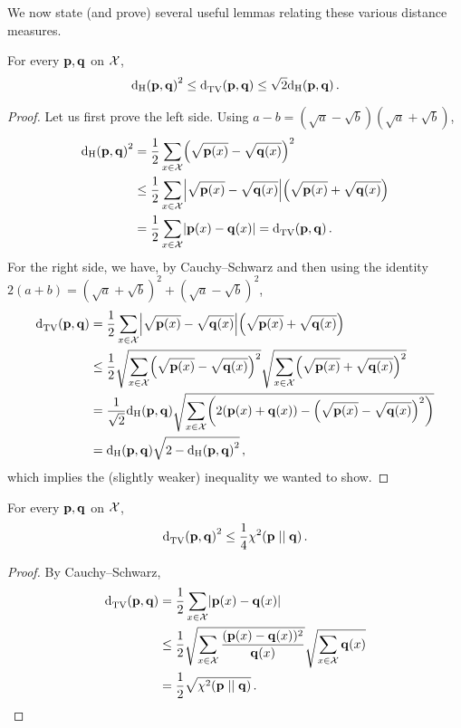 We now state (and prove) several useful lemmas relating these various distance measures.
\begin{lemma}
  \label{app:distances:hellinger}
For every $\mathbf{p},\mathbf{q}$ on $\mathcal{X}$, 
  \[
    \hellinger{\p}{\q}^2 \leq \totalvardist{\p}{\q} \leq \sqrt{2}\hellinger{\p}{\q}\,.
  \]
\end{lemma}
\begin{proof}
  Let us first prove the left side. Using $a-b=(\sqrt{a}-\sqrt{b})(\sqrt{a}+\sqrt{b})$,
  \begin{align*}
      \hellinger{\p}{\q}^2
      &= \frac{1}{2}\sum_{x\in\domain} \Paren{\sqrt{\p(x)}-\sqrt{\q(x)}}^2 \\
      &\leq \frac{1}{2}\sum_{x\in\domain} \abs{\sqrt{\p(x)}-\sqrt{\q(x)}}\Paren{\sqrt{\p(x)}+\sqrt{\q(x)}} \\
      &= \frac{1}{2}\sum_{x\in\domain} \abs{\p(x)-\q(x)} = \totalvardist{\p}{\q}\,.
  \end{align*}
 For the right side, we have, by Cauchy--Schwarz and then using the identity $2(a+b) = (\sqrt{a}+\sqrt{b})^2+(\sqrt{a}-\sqrt{b})^2$,
   \begin{align*}
      \totalvardist{\p}{\q} &= \frac{1}{2}\sum_{x\in\domain} \abs{\sqrt{\p(x)}-\sqrt{\q(x)}}\Paren{\sqrt{\p(x)}+\sqrt{\q(x)}}  \\
      &\leq \frac{1}{2}\sqrt{\sum_{x\in\domain} \Paren{\sqrt{\p(x)}-\sqrt{\q(x)}}^2}\sqrt{\sum_{x\in\domain} \Paren{\sqrt{\p(x)}+\sqrt{\q(x)}}^2} \\
      &= \frac{1}{\sqrt{2}}\hellinger{\p}{\q}\sqrt{\sum_{x\in\domain} \Paren{2(\p(x)+\q(x))-\Paren{\sqrt{\p(x)}-\sqrt{\q(x)}}^2 }}\\
      &= \hellinger{\p}{\q}\sqrt{2-\hellinger{\p}{\q}^2 }\,,
  \end{align*}
  which implies the (slightly weaker) inequality we wanted to show.
\end{proof}

\begin{lemma}
  \label{app:distances:chi2:tv}
For every $\mathbf{p},\mathbf{q}$ on $\mathcal{X}$, 
  \[
    \totalvardist{\p}{\q}^2 \leq \frac{1}{4}\chisquare{\p}{\q}\,.
  \]
\end{lemma}
\begin{proof}
  By Cauchy--Schwarz, 
  \begin{align*}
      \totalvardist{\p}{\q} &= \frac{1}{2}\sum_{x\in\domain} \abs{\p(x)-\q(x)} \\
      &\leq \frac{1}{2}\sqrt{\sum_{x\in\domain} \frac{(\p(x)-\q(x))^2}{\q(x)}}\sqrt{\sum_{x\in\domain} \q(x)} \\
      &= \frac{1}{2}\sqrt{\chisquare{\p}{\q}}\,.
  \end{align*}
\end{proof}

